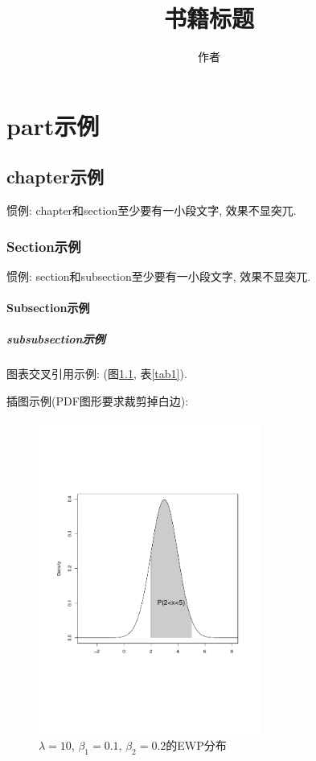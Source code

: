 \documentclass{cosbook}
\begin{document}
\title{书籍标题}
\author{作者}
\maketitle

\tableofcontents %

\part{part示例}

\chapter{chapter示例}
惯例: chapter和section至少要有一小段文字, 效果不显突兀.

\section{Section示例}
惯例: section和subsection至少要有一小段文字, 效果不显突兀.

\subsection{Subsection示例}

\subsubsection{subsubsection示例}

图表交叉引用示例: (图\ref{fig1}, 表\ref{tab1}).

插图示例(PDF图形要求裁剪掉白边):
\begin{figure}[htbp]
\centering
\includegraphics[width=0.65\textwidth]{figure.pdf}
\caption{$\lambda=10$, $\beta_1=0.1$, $\beta_2=0.2$的EWP分布} \label{fig1}
\end{figure}
\end{document}
